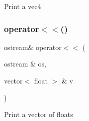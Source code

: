 Print a vec4 \mbox{\label{cout-definitions_8cpp_a337249c538c5d8304a68a31ecc936c81}} 
\subsubsection{\texorpdfstring{operator$<$$<$()}{operator<<()}\hspace{0.1cm}{\footnotesize\ttfamily [4/4]}}
{\footnotesize\ttfamily ostream\& operator$<$$<$ (\begin{DoxyParamCaption}\item[{ostream \&}]{os,  }\item[{vector$<$ float $>$ \&}]{v }\end{DoxyParamCaption})}

Print a vector of floats 